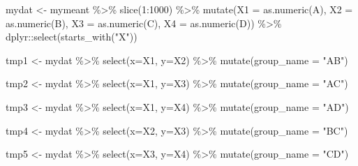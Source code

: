 \documentclass[
]{book}
\newenvironment{Shaded}{\begin{snugshade}}{\end{snugshade}}
\newcommand{\AttributeTok}[1]{\textcolor[rgb]{0.77,0.63,0.00}{#1}}
\newcommand{\DecValTok}[1]{\textcolor[rgb]{0.00,0.00,0.81}{#1}}
\newcommand{\FunctionTok}[1]{\textcolor[rgb]{0.00,0.00,0.00}{#1}}
\newcommand{\NormalTok}[1]{#1}
\newcommand{\OtherTok}[1]{\textcolor[rgb]{0.56,0.35,0.01}{#1}}
\newcommand{\SpecialCharTok}[1]{\textcolor[rgb]{0.00,0.00,0.00}{#1}}
\newcommand{\StringTok}[1]{\textcolor[rgb]{0.31,0.60,0.02}{#1}}
\begin{document}
\begin{Shaded}
\begin{Highlighting}[]


\NormalTok{mydat }\OtherTok{\textless{}{-}}\NormalTok{ mymeant }\SpecialCharTok{\%\textgreater{}\%} 
  \FunctionTok{slice}\NormalTok{(}\DecValTok{1}\SpecialCharTok{:}\DecValTok{1000}\NormalTok{) }\SpecialCharTok{\%\textgreater{}\%} 
  \FunctionTok{mutate}\NormalTok{(}\AttributeTok{X1 =} \FunctionTok{as.numeric}\NormalTok{(A), }
         \AttributeTok{X2 =} \FunctionTok{as.numeric}\NormalTok{(B),}
         \AttributeTok{X3 =} \FunctionTok{as.numeric}\NormalTok{(C),}
         \AttributeTok{X4 =} \FunctionTok{as.numeric}\NormalTok{(D)) }\SpecialCharTok{\%\textgreater{}\%} 
\NormalTok{  dplyr}\SpecialCharTok{::}\FunctionTok{select}\NormalTok{(}\FunctionTok{starts\_with}\NormalTok{(}\StringTok{"X"}\NormalTok{)) }

\NormalTok{tmp1 }\OtherTok{\textless{}{-}}\NormalTok{ mydat }\SpecialCharTok{\%\textgreater{}\%} 
  \FunctionTok{select}\NormalTok{(}\AttributeTok{x=}\NormalTok{X1, }\AttributeTok{y=}\NormalTok{X2) }\SpecialCharTok{\%\textgreater{}\%} 
  \FunctionTok{mutate}\NormalTok{(}\AttributeTok{group\_name =} \StringTok{"AB"}\NormalTok{) }

\NormalTok{tmp2 }\OtherTok{\textless{}{-}}\NormalTok{ mydat }\SpecialCharTok{\%\textgreater{}\%} 
  \FunctionTok{select}\NormalTok{(}\AttributeTok{x=}\NormalTok{X1, }\AttributeTok{y=}\NormalTok{X3) }\SpecialCharTok{\%\textgreater{}\%} 
  \FunctionTok{mutate}\NormalTok{(}\AttributeTok{group\_name =} \StringTok{"AC"}\NormalTok{)}

\NormalTok{tmp3 }\OtherTok{\textless{}{-}}\NormalTok{ mydat }\SpecialCharTok{\%\textgreater{}\%} 
  \FunctionTok{select}\NormalTok{(}\AttributeTok{x=}\NormalTok{X1, }\AttributeTok{y=}\NormalTok{X4) }\SpecialCharTok{\%\textgreater{}\%} 
  \FunctionTok{mutate}\NormalTok{(}\AttributeTok{group\_name =} \StringTok{"AD"}\NormalTok{)}

\NormalTok{tmp4 }\OtherTok{\textless{}{-}}\NormalTok{ mydat }\SpecialCharTok{\%\textgreater{}\%} 
  \FunctionTok{select}\NormalTok{(}\AttributeTok{x=}\NormalTok{X2, }\AttributeTok{y=}\NormalTok{X3) }\SpecialCharTok{\%\textgreater{}\%} 
  \FunctionTok{mutate}\NormalTok{(}\AttributeTok{group\_name =} \StringTok{"BC"}\NormalTok{)}

\NormalTok{tmp5 }\OtherTok{\textless{}{-}}\NormalTok{ mydat }\SpecialCharTok{\%\textgreater{}\%} 
  \FunctionTok{select}\NormalTok{(}\AttributeTok{x=}\NormalTok{X3, }\AttributeTok{y=}\NormalTok{X4) }\SpecialCharTok{\%\textgreater{}\%} 
  \FunctionTok{mutate}\NormalTok{(}\AttributeTok{group\_name =} \StringTok{"CD"}\NormalTok{)}



\end{Highlighting}
\end{Shaded}
\end{document}
